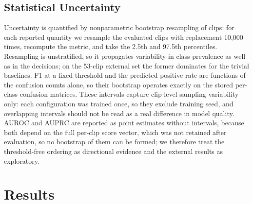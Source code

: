 \documentclass[a4paper,orivec]{llncs}
\begin{document}
\subsection{Statistical Uncertainty}
\label{sec:uncert}
Uncertainty is quantified by nonparametric bootstrap resampling of clips: for each
reported quantity we resample the evaluated clips with replacement 10{,}000 times,
recompute the metric, and take the 2.5th and 97.5th percentiles. Resampling is
unstratified, so it propagates variability in class prevalence as well as in the
decisions; on the 53-clip external set the former dominates for the trivial
baselines. F1 at a fixed threshold and the predicted-positive rate are functions
of the confusion counts alone, so their bootstrap operates exactly on the stored
per-class confusion matrices. These intervals capture clip-level sampling
variability only: each configuration was trained once, so they exclude training
seed, and overlapping intervals should not be read as a real difference in model
quality. AUROC and AUPRC are reported as point estimates without intervals, because
both depend on the full per-clip score vector, which was not retained after
evaluation, so no bootstrap of them can be formed; we therefore treat the
threshold-free ordering as directional evidence and the external results as
exploratory.

\section{Results}
\label{sec:results}
\end{document}
